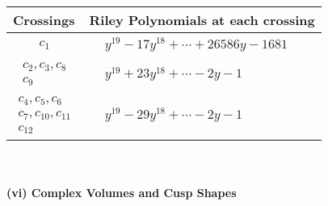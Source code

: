\documentclass[1p]{elsarticle_modified}
\theoremstyle{definition}
\begin{document}
\begin{tabular}{m{50pt}|m{274pt}}
Crossings & \hspace{64pt}Riley Polynomials at each crossing \\
\hline $$\begin{aligned}c_{1}\end{aligned}$$&$\begin{aligned}
&y^{19}-17 y^{18}+\cdots+26586 y-1681
\end{aligned}$\\
\hline $$\begin{aligned}c_{2},c_{3},c_{8}\\c_{9}\end{aligned}$$&$\begin{aligned}
&y^{19}+23 y^{18}+\cdots-2 y-1
\end{aligned}$\\
\hline $$\begin{aligned}c_{4},c_{5},c_{6}\\c_{7},c_{10},c_{11}\\c_{12}\end{aligned}$$&$\begin{aligned}
&y^{19}-29 y^{18}+\cdots-2 y-1
\end{aligned}$\\
\hline
\end{tabular}\\~\\
\newpage\flushleft \textbf{(vi) Complex Volumes and Cusp Shapes}
\end{document}
